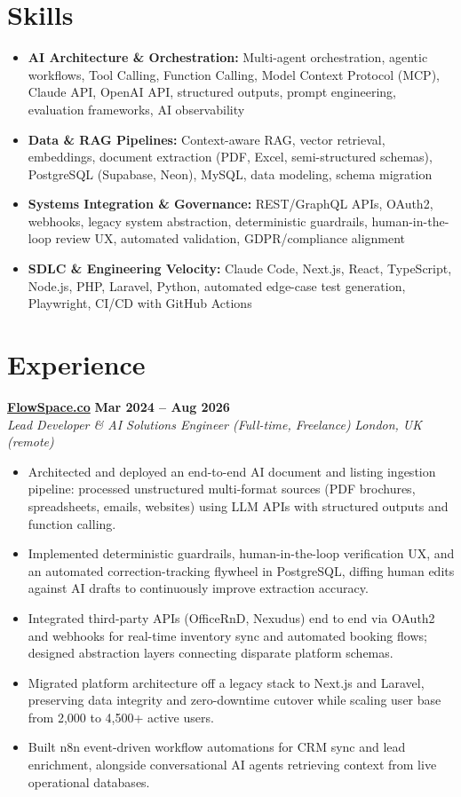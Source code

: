 \documentclass[a4paper,10pt]{article}
\newcommand{\role}[4]{%
  \textbf{#1} \hfill \textbf{#2}\\[1pt]%
  \textit{#3} \hfill \textit{#4}\\[2pt]%
}
\begin{document}
\section{Skills}
\begin{itemize}
  \item \textbf{AI Architecture \& Orchestration:} Multi-agent orchestration, agentic workflows, Tool Calling, Function Calling, Model Context Protocol (MCP), Claude API, OpenAI API, structured outputs, prompt engineering, evaluation frameworks, AI observability
  \item \textbf{Data \& RAG Pipelines:} Context-aware RAG, vector retrieval, embeddings, document extraction (PDF, Excel, semi-structured schemas), PostgreSQL (Supabase, Neon), MySQL, data modeling, schema migration
  \item \textbf{Systems Integration \& Governance:} REST/GraphQL APIs, OAuth2, webhooks, legacy system abstraction, deterministic guardrails, human-in-the-loop review UX, automated validation, GDPR/compliance alignment
  \item \textbf{SDLC \& Engineering Velocity:} Claude Code, Next.js, React, TypeScript, Node.js, PHP, Laravel, Python, automated edge-case test generation, Playwright, CI/CD with GitHub Actions
\end{itemize}

\section{Experience}

\role{\href{https://flowspace.co}{FlowSpace.co}}{Mar 2024 -- Aug 2026}{Lead Developer \& AI Solutions Engineer (Full-time, Freelance)}{London, UK (remote)}
\begin{itemize}
  \item Architected and deployed an end-to-end AI document and listing ingestion pipeline: processed unstructured multi-format sources (PDF brochures, spreadsheets, emails, websites) using LLM APIs with structured outputs and function calling.
  \item Implemented deterministic guardrails, human-in-the-loop verification UX, and an automated correction-tracking flywheel in PostgreSQL, diffing human edits against AI drafts to continuously improve extraction accuracy.
  \item Integrated third-party APIs (OfficeRnD, Nexudus) end to end via OAuth2 and webhooks for real-time inventory sync and automated booking flows; designed abstraction layers connecting disparate platform schemas.
  \item Migrated platform architecture off a legacy stack to Next.js and Laravel, preserving data integrity and zero-downtime cutover while scaling user base from 2,000 to 4,500+ active users.
  \item Built n8n event-driven workflow automations for CRM sync and lead enrichment, alongside conversational AI agents retrieving context from live operational databases.
\end{itemize}
\end{document}
